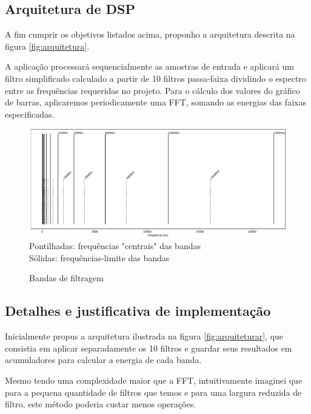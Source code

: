 
\subsection{Arquitetura de DSP}

A fim cumprir os objetivos listados acima, proponho a arquitetura descrita na figura \ref{fig:arquitetura}.

A aplicação processará sequencialmente as amostras de entrada e aplicará um filtro simplificado calculado a partir de 10 filtros passa-faixa dividindo o espectro entre as frequências requeridas no projeto. Para o cálculo dos valores do gráfico de barras, aplicaremos periodicamente uma FFT, somando as energias das faixas especificadas.

\begin{figure}[h]
    \centering
    \includegraphics[scale=.45]{fig/Bands.pdf}\\
    \small{Pontilhadas: frequências "centrais" das bandas}\\
    \small{Sólidas: frequências-limite das bandas}
    \caption{Bandas de filtragem}
    \label{fig:bandas}
\end{figure}


\subsection{Detalhes e justificativa de implementação}


Inicialmente propus a arquitetura ilustrada na figura \ref{fig:arquiteturar}, que consistia em aplicar separadamente os 10 filtros e guardar seus resultados em acumuladores para calcular a energia de cada banda.

Mesmo tendo uma complexidade maior que a FFT, intuitivamente imaginei que para a pequena quantidade de filtros que temos e para uma largura reduzida de filtro, este método poderia custar menos operações.


